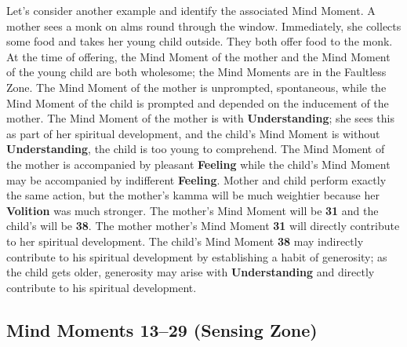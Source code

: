 Let’s consider another example and identify the associated Mind Moment. A mother sees a monk on alms round through the window. Immediately, she collects some food and takes her young child outside. They both offer food to the monk. At the time of offering, the Mind Moment of the mother and the Mind Moment of the young child are both wholesome; the Mind Moments are in the Faultless Zone. The Mind Moment of the mother is unprompted, spontaneous, while the Mind Moment of the child is prompted and depended on the inducement of the mother. The Mind Moment of the mother is with \textbf{Understanding}; she sees this as part of her spiritual development, and the child’s Mind Moment is without \textbf{Understanding}, the child is too young to comprehend. The Mind Moment of the mother is accompanied by pleasant \textbf{Feeling} while the child’s Mind Moment may be accompanied by indifferent \textbf{Feeling}. Mother and child perform exactly the same action, but the mother’s kamma will be much weightier because her \textbf{Volition} was much stronger. The mother’s Mind Moment will be \textbf{31} and the child’s will be \textbf{38}. The mother mother’s Mind Moment \textbf{31} will directly contribute to her spiritual development. The child’s Mind Moment \textbf{38} may indirectly contribute to his spiritual development by establishing a habit of generosity; as the child gets older, generosity may arise with \textbf{Understanding} and directly contribute to his spiritual development.

\subsection*{Mind Moments 13--29 (Sensing Zone)}

